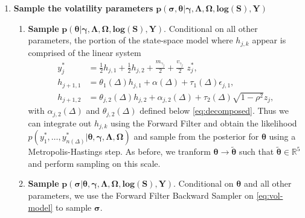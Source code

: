 \begin{enumerate}
\item \textbf{Sample the volatility parameters} $\boldsymbol{p(\sigma, \theta | \gamma, \Lambda, \Omega, \mbox{log}(S), Y)}$

  \begin{enumerate}
    \item \textbf{Sample} $\boldsymbol{p(\theta|\gamma,\Lambda,\Omega,\mbox{log}(S), Y)}$. Conditional on all other parameters, the portion of the state-space model where $h_{j,k}$ appear is comprised of the linear system
      \begin{align}
        y_j^* &= \frac{1}{2}h_{j,1} + \frac{1}{2} h_{j,2} + \frac{m_{\gamma_j}}{2} + \frac{v_{\gamma_j}}{2} \,\, z^*_{j}, \nonumber  \\
  	h_{j+1,1} &= \theta_{1}(\Delta) h_{j,1} + \alpha(\Delta) + \tau_1(\Delta)  \epsilon_{j,1}, \label{eq:vol-model} \\
	h_{j+1,2} &= \theta_{j,2}(\Delta) h_{j,2} + \alpha_{j,2}(\Delta) + \tau_2(\Delta) \sqrt{1 - \rho^2} z_j, \nonumber
      \end{align}
      with $\alpha_{j,2}(\Delta)$ and $\theta_{j,2}(\Delta)$ defined
      below \eqref{eq:decomposed}. Thus we can integrate out $h_{j,k}$
      using the Forward Filter and obtain the likelihood
      $p(y^*_1, \ldots, y_{n(\Delta)}^* |
      \boldsymbol{\theta},\boldsymbol{\gamma},\boldsymbol{\Lambda},\boldsymbol{\Omega})$ and sample from the posterior for
      $\boldsymbol{\theta}$ using a Metropolis-Hastings step. As
      before, we tranform
      $\boldsymbol{\theta} \to \tilde{\boldsymbol{\theta}}$ such that
      $\tilde{\boldsymbol{\theta}} \in \mathbb{R}^5$ and perform
      sampling on this scale.

      \item \textbf{Sample} $\boldsymbol{p(\sigma | \theta, \gamma,\Lambda,\Omega,\mbox{log}(S), Y)}$. Conditional on $\boldsymbol{\theta}$ and all other parameters, we use the Forward Filter Backward Sampler on \eqref{eq:vol-model} to sample $\boldsymbol{\sigma}$.
  \end{enumerate}


\end{enumerate}
